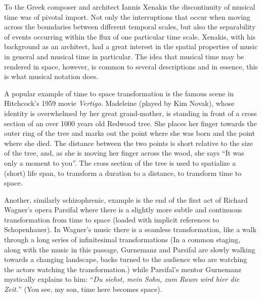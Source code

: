 \documentclass{article}
\begin{document}
To the Greek composer and architect Iannis Xenakis the discontinuity of musical time was of pivotal import. Not only the interruptions that occur when moving across the boundaries between different temporal scales, but also the separability of events occurring within the flux of one particular time scale. Xenakis, with his background as an architect, had a great interest in the spatial properties of music in general and musical time in particular. The idea that musical time may be rendered in space, however, is common to several descriptions and in essence, this is what musical notation does.

A popular example of time to space transformation is the famous scene in Hitchcock's 1959 movie \emph{Vertigo}. Madeleine (played by Kim Novak), whose identity is overwhelmed by her great grand-mother, is standing in front of a cross section of an over 1000 years old Redwood tree. She places her finger towards the outer ring of the tree and marks out the point where she was born and the point where she died. The distance between the two points is short relative to the size of the tree, and, as she is moving her finger across the wood, she says ``It was only a moment to you''. \cite{hitchcock59} The cross section of the tree is used to spatialize a (short) life span, to transform a duration to a distance, to transform time to space. 

Another, similarly schizophrenic, example is the end of the first act of Richard Wagner's opera Parsifal where there is a slightly more subtle and continuous transformation from time to space (loaded with implicit references to Schopenhauer). In Wagner's music there is a seamless transformation, like a walk through a long series of infinitesimal transformations (In a common staging, along with the music in this passage, Gurnemanz and Parsifal are slowly walking towards a changing landscape, backs turned to the audience who are watching the actors watching the transformation.) while Parsifal's mentor Gurnemanz mystically explains to him: ``\emph{Du siehst, mein Sohn, zum Raum wird hier die Zeit.}'' (You see, my son, time here becomes space).
\end{document}
